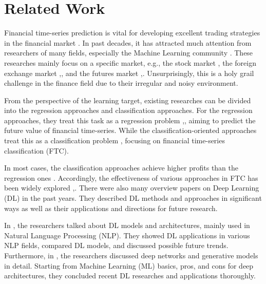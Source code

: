 \documentclass{article}
\begin{document}
\section{Related Work}
\label{sec:Related Work}
Financial time-series prediction is vital for developing excellent trading strategies in the financial market \citep{DBLP:journals/ijbidm/Wang14}. In past decades, it has attracted much attention from researchers of many fields, especially the Machine Learning community \citep{lee1991inferring}. These researches mainly focus on a specific market, e.g., the stock market \citep{DBLP:journals/ijon/Kim03}\citep{DBLP:journals/nca/LiXWCCWMD16}, the foreign exchange market \citep{DBLP:conf/ijcai/LinGA17},\citep{DBLP:journals/eswa/AtsalakisV09}, and the futures market \citep{cheung2019exchange}
,\citep{DBLP:journals/asc/KimAOE17}. Unsurprisingly, this is a holy grail challenge in the finance field due to their irregular and noisy environment.

From the perspective of the learning target, existing researches can be divided into the regression approaches and classification approaches. For the regression approaches, they treat this task as a regression problem \citep{zirilli1996financial},\citep{DBLP:journals/jocs/BollenMZ11}, aiming to predict the future value of financial time-series. While the classification-oriented approaches treat this as a classification problem \citep{DBLP:journals/tois/SchumakerC09},\citep{DBLP:journals/asc/HsiehHY11} focusing on financial time-series classification (FTC).

In most cases, the classification approaches achieve higher profits than the regression ones \citep{DBLP:journals/eswa/HuangYC08}. Accordingly, the effectiveness of various approaches in FTC has been widely explored \citep{DBLP:journals/nca/LiXWCCWMD16},\citep{leung2000forecasting}.
There were also many overview papers on Deep Learning (DL) in the past years. They described DL methods and approaches in significant ways as well as their applications and directions for future research.

In \citep{DBLP:journals/corr/abs-1708-02709}, the researchers talked about DL models and architectures, mainly used in Natural Language Processing (NLP). They showed DL applications in various NLP fields, compared DL models, and discussed possible future trends. Furthermore, in \citep{DBLP:books/daglib/0040158}, the researchers discussed deep networks and generative models in detail. Starting from Machine Learning (ML) basics, pros, and cons for deep architectures, they concluded recent DL researches and applications thoroughly.
%
\end{document}
